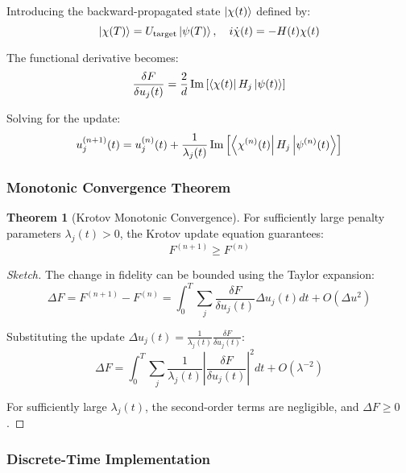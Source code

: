 \documentclass[11pt,a4paper]{article}
\theoremstyle{definition}
\newtheorem{theorem}{Theorem}[section]
\theoremstyle{remark}
\begin{document}
Introducing the backward-propagated state $\ket{\chi(t)}$ defined by:
\begin{equation}
\ket{\chi(T)} = U_{\text{target}}\ket{\psi(T)}, \quad i\dot{\chi}(t) = -H(t)\chi(t)
\end{equation}

The functional derivative becomes:
\begin{equation}
\frac{\delta F}{\delta u_j(t)} = \frac{2}{d}\Im\left[\bra{\chi(t)}H_j\ket{\psi(t)}\right]
\end{equation}

Solving for the update:
\begin{equation}
u_j^{(n+1)}(t) = u_j^{(n)}(t) + \frac{1}{\lambda_j(t)}\Im\left[\bra{\chi^{(n)}(t)} H_j \ket{\psi^{(n)}(t)}\right]
\end{equation}

\subsubsection{Monotonic Convergence Theorem}

\begin{theorem}[Krotov Monotonic Convergence]
For sufficiently large penalty parameters $\lambda_j(t) > 0$, the Krotov update equation guarantees:
\begin{equation}
F^{(n+1)} \geq F^{(n)}
\end{equation}
\end{theorem}

\begin{proof}[Sketch]
The change in fidelity can be bounded using the Taylor expansion:
\begin{equation}
\Delta F = F^{(n+1)} - F^{(n)} = \int_0^T \sum_j \frac{\delta F}{\delta u_j(t)}\Delta u_j(t) dt + O(\Delta u^2)
\end{equation}

Substituting the update $\Delta u_j(t) = \frac{1}{\lambda_j(t)}\frac{\delta F}{\delta u_j(t)}$:
\begin{equation}
\Delta F = \int_0^T \sum_j \frac{1}{\lambda_j(t)}\left|\frac{\delta F}{\delta u_j(t)}\right|^2 dt + O(\lambda^{-2})
\end{equation}

For sufficiently large $\lambda_j(t)$, the second-order terms are negligible, and $\Delta F \geq 0$.
\end{proof}

\subsubsection{Discrete-Time Implementation}
\end{document}
